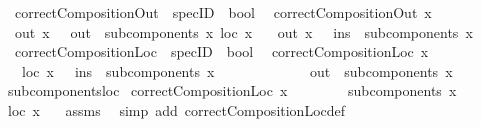 \begin{isabellebody}
\isanewline
%
\isanewline
%
\isanewline
{}\isamarkupfalse%
\isanewline
\ \ correctCompositionOut\ {\isacharcolon}{\isacharcolon}\ {\isachardoublequoteopen}specID\ {\isasymRightarrow}\ bool{\isachardoublequoteclose}\isanewline
{}\isanewline
\ \ {\isachardoublequoteopen}correctCompositionOut\ x\ {\isasymequiv}\ \isanewline
\ \ {\isacharparenleft}out\ x{\isacharparenright}\ {\isacharequal}\ {\isacharparenleft}{\isasymUnion}\ {\isacharparenleft}out\ {\isacharbackquote}\ {\isacharparenleft}subcomponents\ x{\isacharparenright}{\isacharparenright}{\isacharminus}\ {\isacharparenleft}loc\ x{\isacharparenright}{\isacharparenright}\isanewline
\ \ {\isasymand}\ {\isacharparenleft}out\ x{\isacharparenright}\ {\isasyminter}\ {\isacharparenleft}{\isasymUnion}\ {\isacharparenleft}ins\ {\isacharbackquote}\ {\isacharparenleft}subcomponents\ x{\isacharparenright}{\isacharparenright}{\isacharparenright}\ {\isacharequal}\ {\isacharbraceleft}{\isacharbraceright}\ {\isachardoublequoteclose}\ \isanewline
\isanewline
%
\isanewline
%
\isanewline
{}\isamarkupfalse%
\isanewline
\ \ correctCompositionLoc\ {\isacharcolon}{\isacharcolon}\ {\isachardoublequoteopen}specID\ {\isasymRightarrow}\ bool{\isachardoublequoteclose}\isanewline
{}\isanewline
\ \ {\isachardoublequoteopen}correctCompositionLoc\ x\ {\isasymequiv}\ \isanewline
\ \ \ {\isacharparenleft}loc\ x{\isacharparenright}\ {\isacharequal}\ {\isasymUnion}\ {\isacharparenleft}ins\ {\isacharbackquote}\ {\isacharparenleft}subcomponents\ x{\isacharparenright}{\isacharparenright}\isanewline
\ \ \ \ \ \ \ \ \ \ \ {\isasyminter}\ {\isasymUnion}\ {\isacharparenleft}out\ {\isacharbackquote}\ {\isacharparenleft}subcomponents\ x{\isacharparenright}{\isacharparenright}{\isachardoublequoteclose}\ \isanewline
\isanewline
%
\isanewline
%
\isanewline
{}\isamarkupfalse%
\ subcomponents{\isacharunderscore}loc{\isacharcolon}\isanewline
{}\ {\isachardoublequoteopen}correctCompositionLoc\ x{\isachardoublequoteclose}\isanewline
\ \ \ \ \ \ \ \ {\isachardoublequoteopen}subcomponents\ x\ {\isacharequal}\ {\isacharbraceleft}{\isacharbraceright}{\isachardoublequoteclose}\isanewline
{}\ {\isachardoublequoteopen}loc\ x\ {\isacharequal}\ {\isacharbraceleft}{\isacharbraceright}{\isachardoublequoteclose}\isanewline
%
\isadelimproof
%
\endisadelimproof
%
\isatagproof
{}\isamarkupfalse%
\ assms\ \isamarkupfalse%
\ {\isacharparenleft}simp\ add{\isacharcolon}\ correctCompositionLoc{\isacharunderscore}def{\isacharparenright}%
\endisatagproof
{\isafoldproof}%
%
\isadelimproof
\isanewline
%
\endisadelimproof
%
\isadelimtheory
\isanewline
%
\endisadelimtheory
%
\isatagtheory
{}\isamarkupfalse%
%
\endisatagtheory
{\isafoldtheory}%
%
\isadelimtheory
%
\endisadelimtheory
\end{isabellebody}%
